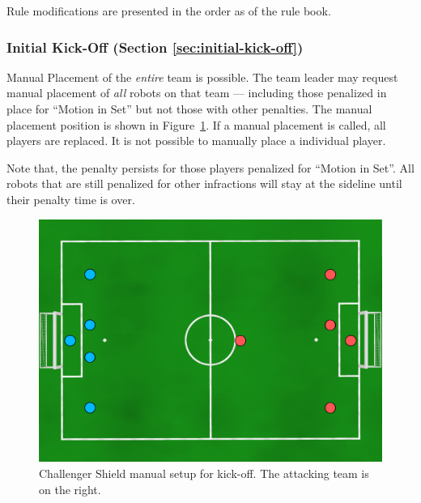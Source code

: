 Rule modifications are presented in the order as of the rule book.

\subsubsection{Initial Kick-Off (Section \ref{sec:initial-kick-off})}
Manual Placement of the \emph{entire} team is possible. The team leader may request manual placement of \emph{all} robots on that team --- including those penalized in place for ``Motion in Set'' but not those with other penalties. The manual placement position is shown in Figure~\ref{fig:ko-manual}. If a manual placement is called, all players are replaced. It is not possible to manually place a individual player.

Note that, the penalty persists for those players penalized for ``Motion in Set''. All robots that are still penalized for other infractions will stay at the sideline until their penalty time is over.

\begin{figure}[t]
\centerline{\includegraphics[width=\columnwidth]{figs/manual-placement-cs.pdf}}
\caption{Challenger Shield manual setup for kick-off.  The attacking team is on the right.}
\label{fig:ko-manual}
\end{figure}

%


